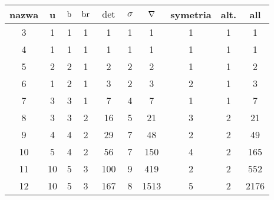 \renewcommand*{\arraystretch}{1.4}
\footnotesize
\begin{longtable}{cccccccccc}
\hline
nazwa & u & $\operatorname{b}$ & $\operatorname{br}$ & $\det$ & $\sigma$ & $\nabla$ & symetria & alt. & all \\ \hline
\endhead %
3 & 1 & 1 & 1 & 1 & 1 & 1 & 1 & 1 & 1 \\
4 & 1 & 1 & 1 & 1 & 1 & 1 & 1 & 1 & 1 \\
5 & 2 & 2 & 1 & 2 & 2 & 2 & 1 & 1 & 2 \\
6 & 1 & 2 & 1 & 3 & 2 & 3 & 2 & 1 & 3 \\
7 & 3 & 3 & 1 & 7 & 4 & 7 & 1 & 1 & 7 \\
8 & 3 & 3 & 2 & 16 & 5 & 21 & 3 & 2 & 21 \\
9 & 4 & 4 & 2 & 29 & 7 & 48 & 2 & 2 & 49 \\
10 & 5 & 4 & 2 & 56 & 7 & 150 & 4 & 2 & 165 \\
11 & 10 & 5 & 3 & 100 & 9 & 419 & 2 & 2 & 552 \\
12 & 10 & 5 & 3 & 167 & 8 & 1513 & 5 & 2 & 2176 \\
\hline
\end{longtable}
\normalsize

